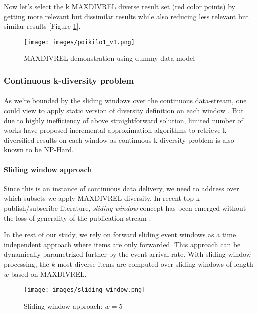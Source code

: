 \documentclass[a4paper,12pt,oneside]{book}
\theoremstyle{definition}
\theoremstyle{remark}
\begin{document}
Now let's select the k MAXDIVREL diverse result set (red color points) by getting more relevant but dissimilar results while also reducing less relevant but similar results [Figure \ref{MAXDIVREL_demo}].


\begin{figure}[h]
\begin{center}
\texttt{[image: images/poikilo1\_v1.png]}
\caption{MAXDIVREL demonstration using dummy data model}
\label{MAXDIVREL_demo}
\end{center}
\end{figure}


\subsubsection{Continuous k-diversity problem}
\paragraph*{}
As we're bounded by the sliding windows over the continuous data-stream, one could view to apply static version of diversity definition on each window \cite{Drosou2009Diversity,Drosou2012ExtendedDiversity}. But due to highly inefficiency of above straightforward solution, limited number of works \cite{Drosou2014ExtendedDiversity, Vee2008} have proposed incremental approximation algorithms to retrieve k diversified results on each window as continuous k-diversity problem is also known to be NP-Hard. 

\paragraph{Sliding window approach}
Since this is an instance of continuous data delivery, we need to address over which subsets we apply MAXDIVREL diversity. In recent top-k publish/subscribe literature, \emph{sliding window} concept has been emerged without the loss of generality of the publication stream \cite{Pripuzi2008, Drosou2009Diversity}.

In the rest of our study, we rely on forward sliding event windows as a time independent approach where items are only forwarded. This approach can be dynamically parametrized further by the event arrival rate. With sliding-window processing, the $k$ most diverse items are computed over sliding windows of length $w$ based on MAXDIVREL. 

\begin{figure}[h]
\begin{center}
\texttt{[image: images/sliding\_window.png]}
\caption{Sliding window approach: $w = 5$}
\label{sliding_window_approach}
\end{center}
\end{figure}
\end{document}
